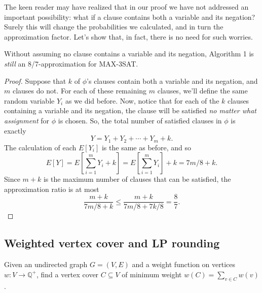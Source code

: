 \documentclass{article}
\newcommand{\Q}{\mathbb{Q}}
\newenvironment{proposition}[2][Proposition]{\begin{trivlist}
\item[\hskip \labelsep {\bfseries #1}\hskip \labelsep {\hspace{-1ex}\bfseries #2.}]}{\end{trivlist}}
\newenvironment{envsection}[1]{\begin{trivlist}
\item[\hskip \labelsep {\bfseries #1}]}{\end{trivlist}}
\begin{document}
\noindent The keen reader may have realized that in our proof we have not addressed an important possibility: what if a clause contains both a variable and its negation? Surely this will change the probabilities we calculated, and in turn the approximation factor. Let's show that, in fact, there is no need for such worries. 


\begin{proposition}{ 2.2}{}
    Without assuming no clause contains a variable and its negation, Algorithm 1 is \textit{still} an 8/7-approximation for MAX-3SAT.
\end{proposition}

\begin{proof}
    Suppose that $k$ of $\phi$'s clauses contain both a variable and its negation, and $m$ clauses do not. For each of these remaining $m$ clauses, we'll define the same random variable $Y_i$ as we did before. Now, notice that for each of the $k$ clauses containing a variable and its negation, the clause will be satisfied \textit{no matter what assignment} for $\phi$ is chosen. So, the total number of satisfied clauses in $\phi$ is exactly
    \[
    Y = Y_1 + Y_2 + \cdots + Y_m + k.
    \]
    The calculation of each $E[Y_i]$ is the same as before, and so
    \[
    E[Y] = E \left[ \sum_{i=1}^{m} Y_i + k \right] = E \left[ \sum_{i=1}^{m} Y_i \right] + k = 7m/8 + k.
    \]
    Since $m + k$ is the maximum number of clauses that can be satisfied, the approximation ratio is at most
    \[
    \frac{m+k}{7m/8 + k} \leq \frac{m+k}{7m/8 + 7k/8} = \frac{8}{7}.
    \]
\end{proof}

\subsection{Weighted vertex cover and LP rounding}

\begin{envsection}{Optimization Problem (Min-Weight Vertex Cover)}
    Given an undirected graph $G = (V,E)$ and a weight function on vertices $w: V \to \Q^+$, find a vertex cover $C \subseteq V$ of minimum weight $w(C) = \sum_{v \in C} w(v)$.
\end{envsection}
\end{document}
